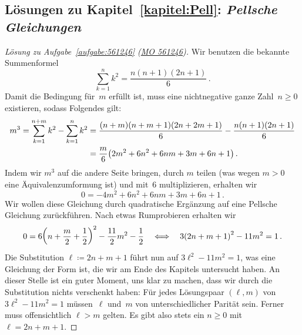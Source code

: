 \subsection*{Lösungen zu Kapitel~\ref{kapitel:Pell}: \emph{Pellsche Gleichungen}}

\begin{proof}[Lösung zu Aufgabe~\ref{aufgabe:561246} \textmd{(\href{https://www.mathematik-olympiaden.de/moev/index.php?option=com_download&thema=a&datei=A56124b.pdf&format=raw}{MO 561246})}]
	Wir benutzen die bekannte Summenformel
	\begin{equation*}
		\sum_{k=1}^nk^2=\frac{n(n+1)(2n+1)}{6}\,.
	\end{equation*}
	Damit die Bedingung für~$m$ erfüllt ist, muss eine nichtnegative ganze Zahl~$n\geqslant 0$ existieren, sodass Folgendes gilt:
	\begin{align*}
		m^3=\sum_{k=1}^{n+m}k^2-\sum_{k=1}^nk^2&=\frac{(n+m)(n+m+1)(2n+2m+1)}{6}-\frac{n(n+1)(2n+1)}{6}\\
		&=\frac{m}{6}\parens*{2m^2+6n^2+6nm+3m+6n+1}\,.
	\end{align*}
	Indem wir $m^3$ auf die andere Seite bringen, durch $m$ teilen (was wegen $m>0$ eine Äquivalenzumformung ist) und mit~$6$ multiplizieren, erhalten wir
	\begin{equation*}
		0=-4m^2+6n^2+6nm+3m+6n+1\,.
	\end{equation*}
	Wir wollen diese Gleichung durch quadratische Ergänzung auf eine Pellsche Gleichung zurückführen. Nach etwas Rumprobieren erhalten wir
	\begin{equation*}
		0=6\parens*{n+\frac{m}{2}+\frac12}^2-\frac{11}2m^2-\frac12\quad\Longleftrightarrow\quad 3\parens*{2n+m+1}^2-11m^2=1\,.
	\end{equation*}
	Die Substitution $\ell\coloneqq 2n+m+1$ führt nun auf $3\ell^2-11m^2=1$, was eine Gleichung der Form ist, die wir am Ende des Kapitels untersucht haben. An dieser Stelle ist ein guter Moment, uns klar zu machen, dass wir durch die Substitution nichts verschenkt haben: Für jedes Lösungspaar $(\ell,m)$ von $3\ell^2-11m^2=1$ müssen~$\ell$ und~$m$ von unterschiedlicher Parität sein. Ferner muss offensichtlich $\ell>m$ gelten. Es gibt also stets ein $n\geqslant 0$ mit $\ell=2n+m+1$.
	

\end{proof}

